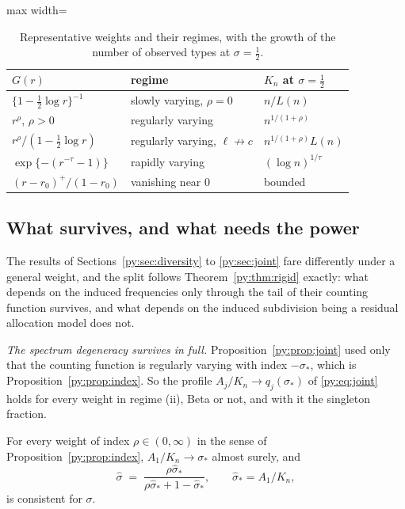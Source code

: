 \begin{table}[t]
\centering
\caption{Representative weights and their regimes, with the growth of the number of observed types
at $\sigma = \tfrac12$.}
\label{py:tab:examples}
\begin{adjustbox}{max width=\textwidth}
\begin{tabular}{lll}
\toprule
$G(r)$ & regime & $K_n$ at $\sigma = \tfrac12$\\
\midrule
$\{1-\tfrac12\log r\}^{-1}$ & slowly varying, $\rho = 0$ & $n/L(n)$\\
$r^{\rho}$, $\rho > 0$ & regularly varying & $n^{1/(1+\rho)}$\\
$r^{\rho}/(1-\tfrac12\log r)$ & regularly varying, $\ell \not\to c$ & $n^{1/(1+\rho)}L(n)$\\
$\exp\{-(r^{-\tau}-1)\}$ & rapidly varying & $(\log n)^{1/\tau}$\\
$(r-r_0)^{+}/(1-r_0)$ & vanishing near $0$ & bounded\\
\bottomrule
\end{tabular}
\end{adjustbox}
\end{table}

\subsection{What survives, and what needs the power}
\label{py:sec:survives}

The results of Sections~\ref{py:sec:diversity} to \ref{py:sec:joint} fare differently under a general
weight, and the split follows Theorem~\ref{py:thm:rigid} exactly: what depends on the induced
frequencies only through the tail of their counting function survives, and what depends on the
induced subdivision being a residual allocation model does not.

\emph{The spectrum degeneracy survives in full.} Proposition~\ref{py:prop:joint} used only that the
counting function is regularly varying with index $-\sigma_*$, which is
Proposition~\ref{py:prop:index}. So the profile $A_j/K_n \to q_j(\sigma_*)$ of \eqref{py:eq:joint} holds for every weight in regime (ii), Beta or
not, and with it the singleton fraction.

\begin{corollary}
\label{py:cor:anyweight}
For every weight of index $\rho \in (0,\infty)$ in the sense of Proposition~\ref{py:prop:index}, $A_1/K_n \to \sigma_*$ almost surely, and
\[
\hat\sigma \;=\; \frac{\rho\hat\sigma_*}{\rho\hat\sigma_* + 1 - \hat\sigma_*},
\qquad \hat\sigma_* = A_1/K_n,
\]
is consistent for $\sigma$.
\end{corollary}

